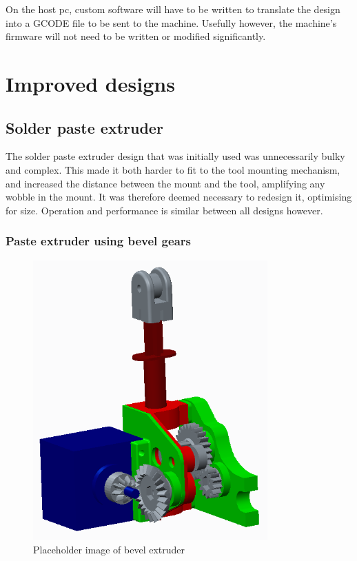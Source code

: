 On the host pc, custom software will have to be written to translate the design into a GCODE file to be sent to the machine. Usefully however,
the machine's firmware will not need to be written or modified significantly.

\section{Improved designs}

\subsection{Solder paste extruder}

The solder paste extruder design that was initially used was unnecessarily bulky and complex. This made it both harder to fit to the tool mounting mechanism, and increased the
distance between the mount and the tool, amplifying any wobble in the mount. It was therefore deemed necessary to redesign it, optimising for size. Operation and performance
is similar between all designs however.

\subsubsection{Paste extruder using bevel gears}
\begin{figure}[ht!]
\centering
\includegraphics[width=90mm]{resources/extruder_bevel.png}
\caption{Placeholder image of bevel extruder}
\label{overflow}
\end{figure}

